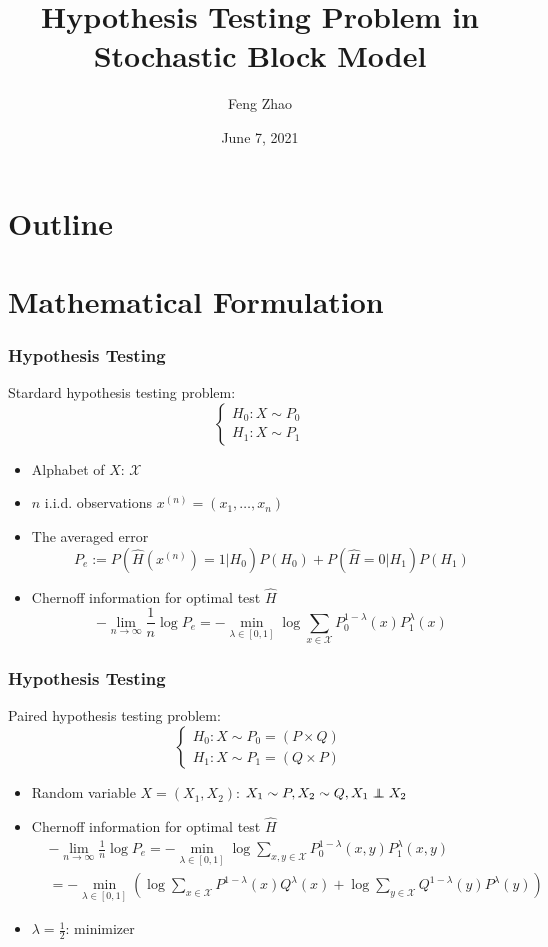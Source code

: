 \documentclass{beamer}
\title{Hypothesis Testing Problem in Stochastic Block Model}
\author{Feng Zhao}
\date{June 7, 2021}
\newcommand\independent{\protect\mathpalette{\protect\independenT}{\perp}}
\def\independenT#1#2{\mathrel{\rlap{$#1#2$}\mkern2mu{#1#2}}}
\begin{document}
\begin{frame}
	\titlepage
\end{frame}
\section*{Outline}
\begin{frame}
	\tableofcontents
\end{frame}

\section{Mathematical Formulation}
\begin{frame}
\frametitle{Hypothesis Testing}
Stardard hypothesis testing problem:
\begin{equation}
\begin{cases}
H_0: X \sim P_0 \\
H_1: X \sim P_1
\end{cases}
\end{equation}
\begin{itemize}
\item Alphabet of $X$: $\mathcal{X}$
\item $n$ i.i.d. observations $x^{(n)}=(x_1, \dots, x_n)$
\item The averaged error
$$
P_e := P(\widehat{H}(x^{(n)})=1|H_0)P(H_0) + P(\widehat{H}=0|H_1)P(H_1)
$$
\item Chernoff information for optimal test $\widehat{H}$
\begin{equation}
-\lim_{n\to\infty} \frac{1}{n}\log P_e = -\min_{\lambda \in [0,1]}
\log \sum_{x\in \mathcal{X}}
P^{1-\lambda}_0(x) P^{\lambda}_1(x) 
\end{equation}
\end{itemize}
\end{frame}
\begin{frame}\frametitle{Hypothesis Testing}
Paired hypothesis testing problem:
\begin{equation*}
\begin{cases}
H_0: X \sim P_0=(P \times Q)\\
H_1: X \sim P_1=(Q \times P)
\end{cases}
\end{equation*}
\begin{itemize}
\item Random variable $X=(X_1, X_2)$: $X_1 \sim P, X_2 \sim Q, X_1 \independent X_2$
\item Chernoff information for optimal test $\widehat{H}$
\begin{align*}
&-\lim_{n\to\infty} \frac{1}{n}\log P_e = -\min_{\lambda \in [0,1]}
\log \sum_{x,y\in \mathcal{X}}
P^{1-\lambda}_0(x,y) P^{\lambda}_1(x,y)  \\
&= -\min_{\lambda \in [0,1]}
\left(\log \sum_{x\in \mathcal{X}}
P^{1-\lambda}(x) Q^{\lambda}(x) 
+\log \sum_{y\in \mathcal{X}}
Q^{1-\lambda}(y) P^{\lambda}(y) 
\right)
\end{align*}
\item $\lambda=\frac{1}{2}$: minimizer
\end{itemize}
\end{frame}
\end{document}
